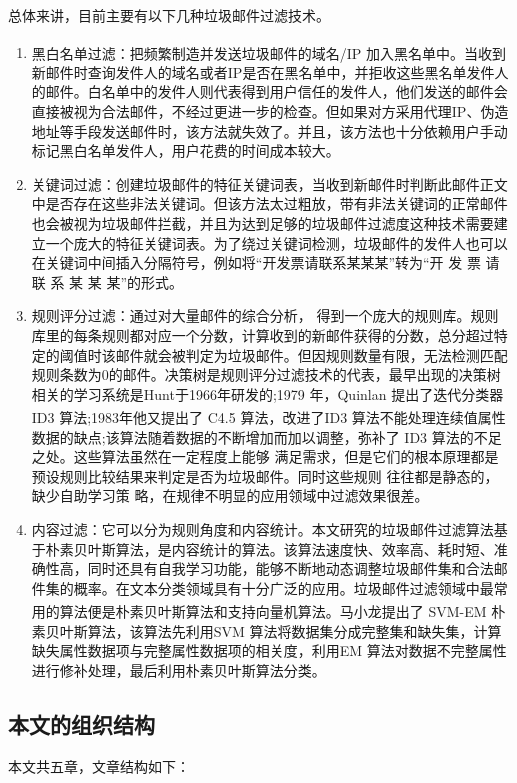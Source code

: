 \documentclass[UTF8,zihao=-4]{ctexart}
\newcommand{\upcite}[1]{\textsuperscript{\cite{#1}}}
\begin{document}
总体来讲，目前主要有以下几种垃圾邮件过滤技术。
\begin{enumerate}
	\item 黑白名单过滤\upcite{anti-spam}：把频繁制造并发送垃圾邮件的域名/IP 加入黑名单中。当收到新邮件时查询发件人的域名或者IP是否在黑名单中，并拒收这些黑名单发件人的邮件\cite{zhangpei}。白名单中的发件人则代表得到用户信任的发件人，他们发送的邮件会直接被视为合法邮件，不经过更进一步的检查。但如果对方采用代理IP、伪造地址等手段发送邮件时，该方法就失效了。并且，该方法也十分依赖用户手动标记黑白名单发件人，用户花费的时间成本较大。
	\item 关键词过滤：创建垃圾邮件的特征关键词表，当收到新邮件时判断此邮件正文中是否存在这些非法关键词。但该方法太过粗放，带有非法关键词的正常邮件也会被视为垃圾邮件拦截，并且为达到足够的垃圾邮件过滤度这种技术需要建立一个庞大的特征关键词表。为了绕过关键词检测，垃圾邮件的发件人也可以在关键词中间插入分隔符号，例如将“开发票请联系某某某”转为“开 \textyen 发 \textyen 票 \textyen 请 \textyen 联 \textyen 系 \textyen 某 \textyen 某 \textyen 某”的形式。
	\item 规则评分过滤：通过对大量邮件的综合分析， 得到一个庞大的规则库。规则库里的每条规则都对应一个分数，计算收到的新邮件获得的分数\cite{zhangpei}，总分超过特定的阈值时该邮件就会被判定为垃圾邮件。但因规则数量有限，无法检测匹配规则条数为0的邮件。决策树是规则评分过滤技术的代表，最早出现的决策树相关的学习系统是Hunt于1966年研发的;1979 年，Quinlan 提出了迭代分类器 ID3 算法;1983年他又提出了 C4.5 算法\upcite{haibo,wux}，改进了ID3 算法不能处理连续值属性数据的缺点;该算法随着数据的不断增加而加以调整，弥补了 ID3 算法的不足之处\cite{caocuiling}。这些算法虽然在一定程度上能够 满足需求，但是它们的根本原理都是预设规则比较结果来判定是否为垃圾邮件。同时这些规则 往往都是静态的，缺少自助学习策 略，在规律不明显的应用领域中过滤效果很差。
	
	\item 内容过滤：它可以分为规则角度和内容统计。本文研究的垃圾邮件过滤算法基于朴素贝叶斯算法，是内容统计的算法。该算法速度快、效率高、耗时短、准确性高，同时还具有自我学习功能，能够不断地动态调整垃圾邮件集和合法邮件集的概率。在文本分类领域具有十分广泛的应用。垃圾邮件过滤领域中最常用的算法便是朴素贝叶斯算法和支持向量机算法\upcite{yanglei}。马小龙提出了 SVM-EM 朴素贝叶斯算法，该算法先利用SVM 算法将数据集分成完整集和缺失集，计算缺失属性数据项与完整属性数据项的相关度，利用EM 算法对数据不完整属性进行修补处理，最后利用朴素贝叶斯算法分类\cite{maxiaolong}。
\end{enumerate}

\subsection{本文的组织结构}
	本文共五章，文章结构如下：
	
\end{document}
